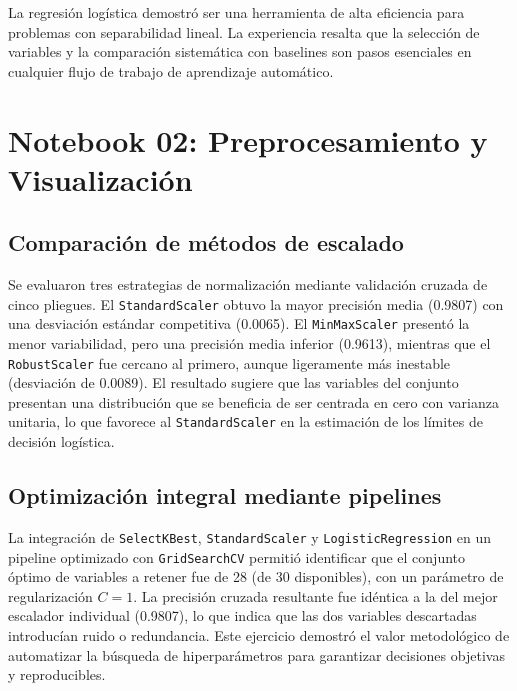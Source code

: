 \documentclass[12pt, a4paper]{article}
\begin{document}
La regresión logística demostró ser una herramienta de alta eficiencia para problemas con separabilidad lineal. La experiencia resalta que la selección de variables y la comparación sistemática con baselines son pasos esenciales en cualquier flujo de trabajo de aprendizaje automático.

\newpage

\section{Notebook 02: Preprocesamiento y Visualización}

\subsection{Comparación de métodos de escalado}

Se evaluaron tres estrategias de normalización mediante validación cruzada de cinco pliegues. El \texttt{StandardScaler} obtuvo la mayor precisión media (0.9807) con una desviación estándar competitiva (0.0065). El \texttt{MinMaxScaler} presentó la menor variabilidad, pero una precisión media inferior (0.9613), mientras que el \texttt{RobustScaler} fue cercano al primero, aunque ligeramente más inestable (desviación de 0.0089). El resultado sugiere que las variables del conjunto presentan una distribución que se beneficia de ser centrada en cero con varianza unitaria, lo que favorece al \texttt{StandardScaler} en la estimación de los límites de decisión logística.

\subsection{Optimización integral mediante pipelines}

La integración de \texttt{SelectKBest}, \texttt{StandardScaler} y \texttt{LogisticRegression} en un pipeline optimizado con \texttt{GridSearchCV} permitió identificar que el conjunto óptimo de variables a retener fue de 28 (de 30 disponibles), con un parámetro de regularización $C=1$. La precisión cruzada resultante fue idéntica a la del mejor escalador individual (0.9807), lo que indica que las dos variables descartadas introducían ruido o redundancia. Este ejercicio demostró el valor metodológico de automatizar la búsqueda de hiperparámetros para garantizar decisiones objetivas y reproducibles.
\end{document}
